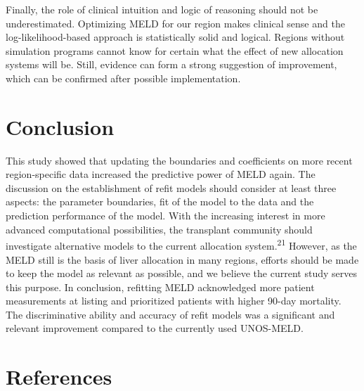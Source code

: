\documentclass[11pt,english,]{book} %
\begin{document}
Finally, the role of clinical intuition and logic of reasoning should not be underestimated. Optimizing MELD for our region makes clinical sense and the log-likelihood-based approach is statistically solid and logical. Regions without simulation programs cannot know for certain what the effect of new allocation systems will be. Still, evidence can form a strong suggestion of improvement, which can be confirmed after possible implementation.

\hypertarget{conclusion-1}{%
\section*{Conclusion}\label{conclusion-1}}

This study showed that updating the boundaries and coefficients on more recent region-specific data increased the predictive power of MELD again. The discussion on the establishment of refit models should consider at least three aspects: the parameter boundaries, fit of the model to the data and the prediction performance of the model. With the increasing interest in more advanced computational possibilities, the transplant community should investigate alternative models to the current allocation system.\textsuperscript{21} However, as the MELD still is the basis of liver allocation in many regions, efforts should be made to keep the model as relevant as possible, and we believe the current study serves this purpose. In conclusion, refitting MELD acknowledged more patient measurements at listing and prioritized patients with higher 90-day mortality. The discriminative ability and accuracy of refit models was a significant and relevant improvement compared to the currently used UNOS-MELD.

\newpage
\linespread{1}
\small

\hypertarget{references-2}{%
\section*{References}\label{references-2}}
\end{document}
